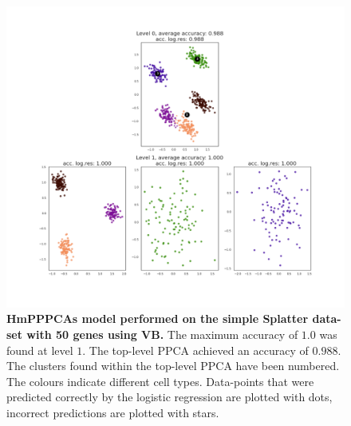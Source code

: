 \begin{figure}
    \centering
    \includegraphics[width=\linewidth]{figs/simple_50_vb.png}
    \caption[HmPPPCAs model performed on the simple Splatter data-set with 50 genes using VB]{\small \textbf{HmPPPCAs model performed on the simple Splatter data-set with 50 genes using VB.} \small The maximum accuracy of $1.0$ was found at level $1$. The top-level PPCA achieved an accuracy of $0.988$. The clusters found within the top-level PPCA have been numbered. The colours indicate different cell types. Data-points that were predicted correctly by the logistic regression are plotted with dots, incorrect predictions are plotted with stars.}
    \label{fig:simple_50_vb}
\end{figure}

